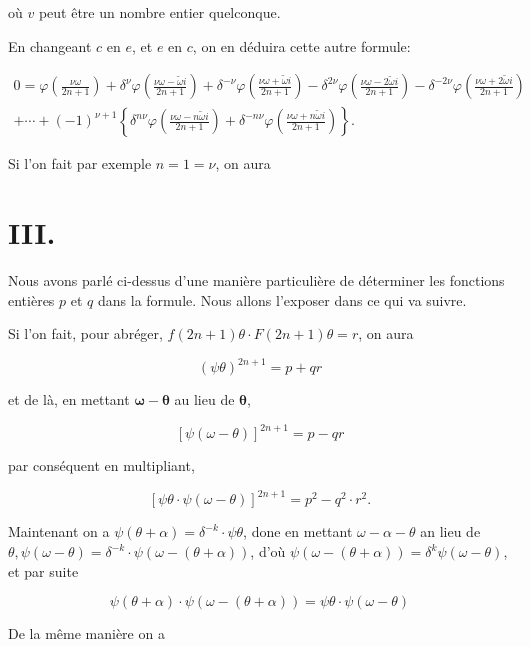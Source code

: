 \documentclass{article}
\begin{document}
où \(v\) peut être un nombre entier quelconque.

En changeant \(c\) en \(e\), et \(e\) en \(c\), on en déduira cette autre formule:

\[
\begin{gathered}
0=\varphi\left(\frac{\nu \omega}{2 n+1}\right)+\delta^{\nu} \varphi\left(\frac{\nu \omega-\tilde{\omega} i}{2 n+1}\right)+\delta^{-\nu} \varphi\left(\frac{\nu \omega+\tilde{\omega} i}{2 n+1}\right)-\delta^{2 \nu} \varphi\left(\frac{\nu \omega-2 \tilde{\omega} i}{2 n+1}\right)-\delta^{-2 \nu} \varphi\left(\frac{\nu \omega+2 \tilde{\omega} i}{2 n+1}\right) \\
+\cdots+(-1)^{\nu+1}\left\{\delta^{n \nu} \varphi\left(\frac{\nu \omega-n \tilde{\omega} i}{2 n+1}\right)+\delta^{-n \nu} \varphi\left(\frac{\nu \omega+n \tilde{\omega} i}{2 n+1}\right)\right\} .
\end{gathered}
\]

Si l'on fait par exemple \(n=1=\nu\), on aura

\section*{III.}

Nous avons parlé ci-dessus d'une manière particulière de déterminer les fonctions entières \(p\) et \(q\) dans la formule. Nous allons l'exposer dans ce qui va suivre.

Si l'on fait, pour abréger, \(f(2 n+1) \theta \cdot F(2 n+1) \theta=r\), on aura

\[
(\psi \theta)^{2 n+1}=p+q r
\]

et de là, en mettant \(\boldsymbol{\omega}-\boldsymbol{\theta}\) au lieu de \(\boldsymbol{\theta}\),

\[
[\psi(\omega-\theta)]^{2 n+1}=p-q r
\]

par conséquent en multipliant,

\[
[\psi \theta \cdot \psi(\omega-\theta)]^{2 n+1}=p^{2}-q^{2} \cdot r^{2} .
\]

Maintenant on a \(\psi(\theta+\alpha)=\delta^{-k} \cdot \psi \theta\), done en mettant \(\omega-\alpha-\theta\) an lieu de \(\theta, \psi(\omega-\theta)=\delta^{-k} \cdot \psi(\omega-(\theta+\alpha))\), d'où \(\psi(\omega-(\theta+\alpha))=\delta^{k} \psi(\omega-\theta)\), et par suite

\[
\psi(\theta+\alpha) \cdot \psi(\omega-(\theta+\alpha))=\psi \theta \cdot \psi(\omega-\theta)
\]

De la même manière on a
\end{document}
